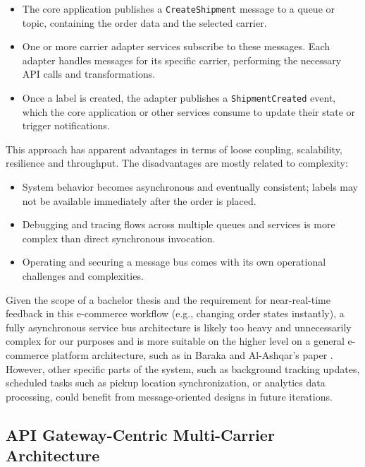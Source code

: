 \documentclass{imc-inf}
\begin{document}
\begin{itemize}[itemsep=3pt]
  \item The core application publishes a \verb|CreateShipment| message to a queue or topic, containing the order data and the selected carrier.
  \item One or more carrier adapter services subscribe to these messages. Each adapter handles messages for its specific carrier, performing the necessary API calls and transformations.
  \item Once a label is created, the adapter publishes a \verb|ShipmentCreated| event, which the core application or other services consume to update their state or trigger notifications.
\end{itemize}

This approach has apparent advantages in terms of loose coupling, scalability, resilience and throughput.
The disadvantages are mostly related to complexity:

\begin{itemize}[itemsep=3pt]
  \item System behavior becomes asynchronous and eventually consistent; labels may not be available immediately after the order is placed.
  \item Debugging and tracing flows across multiple queues and services is more complex than direct synchronous invocation.
  \item Operating and securing a message bus comes with its own operational challenges and complexities.
\end{itemize}

Given the scope of a bachelor thesis and the requirement for near-real-time feedback in this e-commerce workflow (e.g., changing order states instantly), a fully asynchronous service bus architecture is likely too heavy and unnecessarily complex for our purposes and is more suitable on the higher level on a general e-commerce platform architecture, such as in Baraka and Al-Ashqar's paper \cite{barakaBuildingSOABasedModel2013}.
However, other specific parts of the system, such as background tracking updates, scheduled tasks such as pickup location synchronization, or analytics data processing, could benefit from message-oriented designs in future iterations.

\subsection{API Gateway-Centric Multi-Carrier Architecture}
\end{document}

